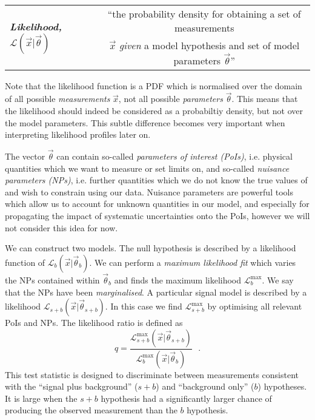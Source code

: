  \vspace{0.2cm}
 \begin{table}[h!]
 \begin{tabular}{lc}
\multirow{2}{*}{\textbf{\emph{Likelihood,}} $\mathcal{L}\left(\vec{x}|\vec{\theta}\right)$} \hspace{0.5cm}  & ``the probability density for obtaining a set of measurements  \\
&  $\vec{x}$ \textit{given} a model hypothesis and set of model parameters $\vec\theta$''
\end{tabular}
\end{table}

Note that the likelihood function is a PDF which is normalised over the domain of all possible \textit{measurements} $\vec{x}$, not all possible \textit{parameters} $\vec{\theta}$. This means that the likelihood should indeed be considered as a probabiltiy density, but not over the model parameters. This subtle difference becomes very important when interpreting likelihood profiles later on.

The vector $\vec{\theta}$ can contain so-called \textit{parameters of interest (PoIs)}, i.e. physical quantities which we want to measure or set limits on, and so-called \textit{nuisance parameters (NPs)}, i.e. further quantities which we do not know the true values of and wish to constrain using our data. Nuisance parameters are powerful tools which allow us to account for unknown quantities in our model, and especially for propagating the impact of systematic uncertainties onto the PoIs, however we will not consider this idea for now.

We can construct two models. The null hypothesis is described by a likelihood function of $\mathcal{L}_b\left(\vec{x}|\vec{\theta}_b\right)$. We can perform a \textit{maximum likelihood fit} which varies the NPs contained within $\vec{\theta}_b$ and finds the maximum likelihood $\mathcal{L}^\text{max}_b$. We say that the NPs have been \textit{marginalised}. A particular signal model is described by a likelihood $\mathcal{L}_{s+b}\left(\vec{x}|\vec{\theta}_{s+b}\right)$. In this case we find $\mathcal{L}^\text{max}_{s+b}$ by optimising all relevant PoIs and NPs. The likelihood ratio is defined as 
\begin{equation}
q =
\frac{ \mathcal{L}^\text{max}_{s+b}\left(\vec{x}|\vec{\theta}_{s+b}\right) }{ \mathcal{L}^\text{max}_b\left(\vec{x}|\vec{\theta}_b\right) } ~~~.
\end{equation}
This test statistic is designed to discriminate between measurements consistent with the ``signal plus background'' ($s+b$) and ``background only'' ($b$) hypotheses. It is large when the $s+b$ hypothesis had a significantly larger chance of producing the observed measurement than the $b$ hypothesis.

